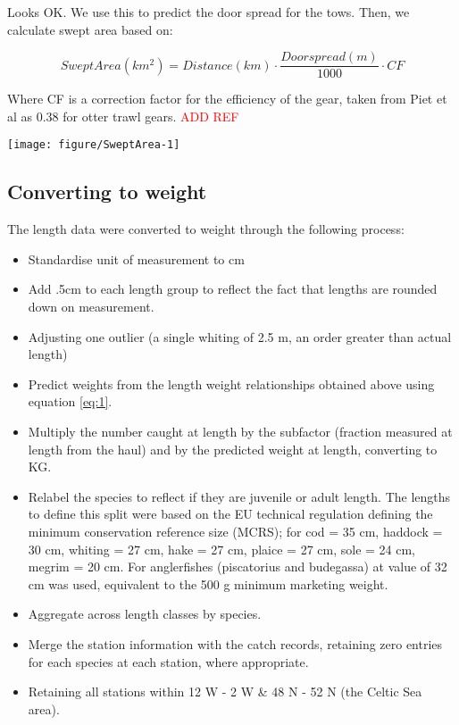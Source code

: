 \documentclass[12pt]{article}\usepackage[]{graphicx}\usepackage[]{color}
\makeatletter
\def\maxwidth{ %
  \ifdim\Gin@nat@width>\linewidth
    \linewidth
  \else
    \Gin@nat@width
  \fi
}
\newenvironment{knitrout}{}{} %
\makeatother
\begin{document}
Looks OK.  We use this to predict the door spread for the tows. Then, we calculate
swept area based on:

\begin{equation}
	Swept Area (km^2) = Distance (km) \cdot \frac{Doorspread (m)}{1000}
	\cdot CF 
\end{equation}

Where CF is a correction factor for the efficiency of the gear, taken from Piet
et al as 0.38 for otter trawl gears. \textcolor{red}{ADD REF}

\begin{knitrout}\footnotesize
{}\color{fgcolor}

{\centering \texttt{[image: figure/SweptArea-1]} 

}



\end{knitrout}

\subsection{Converting to weight}

The length data were converted to weight through the following process:

\begin{itemize}
	\item Standardise unit of measurement to cm
	\item Add .5cm to each length group to reflect the fact that lengths
		are rounded down on measurement.
	\item Adjusting one outlier (a single whiting of 2.5 m, an order
		greater than actual length) 
	\item Predict weights from the length weight relationships obtained
		above using equation \ref{eq:1}.
	\item Multiply the number caught at length by the subfactor (fraction
		measured at length from the haul) and by the predicted weight
		at length, converting to KG.
	\item Relabel the species to reflect if they are juvenile or adult
		length. The lengths to define this split were based on the EU
		technical regulation defining the minimum conservation
		reference size (MCRS); for cod = 35 cm, haddock = 30 cm,
		whiting = 27 cm, hake = 27 cm, plaice = 27 cm, sole = 24 cm,
		megrim = 20 cm. For anglerfishes (piscatorius and budegassa) at
		value of 32 cm was used, equivalent to the 500 g minimum
		marketing weight.
	\item Aggregate across length classes by species.
	\item Merge the station information with the catch records, retaining
		zero entries for each species at each station, where
		appropriate.
	\item Retaining all stations within 12 W - 2 W \&  48 N - 52 N (the
		Celtic Sea area).
\end{itemize}
\end{document}
